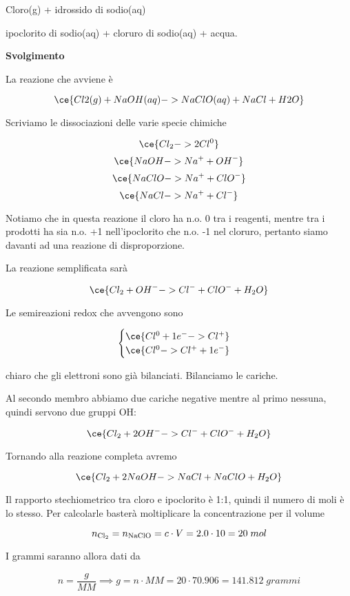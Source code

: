 \begin{center}
    Cloro(g) + idrossido di sodio(aq) \ce{->} 
    
    \ce{->} ipoclorito di sodio(aq) + cloruro di sodio(aq) + acqua. 
\end{center}

\vspace{0.2cm}\large\textbf{Svolgimento}\normalsize

\vspace{0.2cm}La reazione che avviene è

$$\ce{Cl2(g) + NaOH(aq) ->  NaClO(aq) + NaCl + H2O}$$

Scriviamo le dissociazioni delle varie specie chimiche

$$\ce{Cl_2 -> 2Cl^0 }$$
$$\ce{NaOH -> Na^+ + OH^-}$$
$$\ce{NaClO -> Na^+ + ClO^-}$$
$$\ce{NaCl -> Na^+ + Cl^-}$$

Notiamo che in questa reazione il cloro ha n.o. 0 tra i reagenti, mentre tra i prodotti ha sia n.o. +1 nell'ipoclorito che n.o. -1 nel cloruro, pertanto siamo davanti ad una reazione di disproporzione.

La reazione semplificata sarà

$$\ce{Cl_2 + OH^- -> Cl^- + ClO^- + H_2O}$$

Le semireazioni redox che avvengono sono

$$\begin{cases}
    \ce{Cl^{0} + 1e^- -> Cl^+}\\
    \ce{Cl^{0} -> Cl^+ + 1e^-}
\end{cases}$$

\E chiaro che gli elettroni sono già bilanciati. Bilanciamo le cariche.

Al secondo membro abbiamo due cariche negative mentre al primo nessuna, quindi servono due gruppi OH:

$$\ce{Cl_2 + 2OH^- -> Cl^- + ClO^- + H_2O}$$

Tornando alla reazione completa avremo

$$\ce{Cl_2 + 2NaOH -> NaCl + NaClO + H_2O}$$

Il rapporto stechiometrico tra cloro e ipoclorito è 1:1, quindi il numero di moli è lo stesso. Per calcolarle basterà moltiplicare la concentrazione per il volume

$$n_{\rm Cl_2}=n_{\rm NaClO}=c \cdot V=2.0 \cdot 10=20\;mol$$

I grammi saranno allora dati da

$$n=\frac{g}{MM} \implies g=n \cdot MM=20 \cdot 70.906=141.812\;grammi$$

